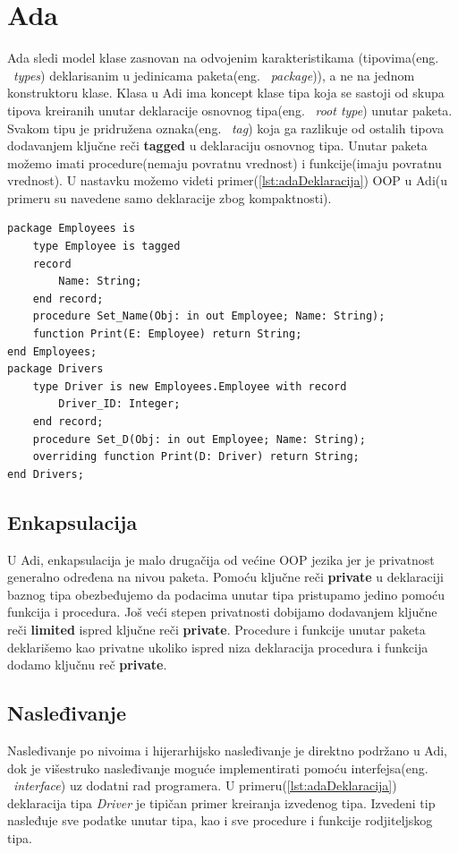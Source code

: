 \documentclass[a4paper]{article}
\begin{document}
{\section{Ada}
\label{sec:ada}

Ada sledi model klase zasnovan na odvojenim karakteristikama (tipovima(eng. ~{\em types}) deklarisanim u jedinicama paketa(eng. ~{\em package})), a ne na jednom konstruktoru klase\cite{oopAda}. Klasa u Adi ima koncept klase tipa koja se sastoji od skupa tipova kreiranih unutar deklaracije osnovnog tipa(eng. ~{\em root type}) unutar paketa. Svakom tipu je pridružena oznaka(eng. ~{\em tag}) koja ga razlikuje od ostalih tipova dodavanjem ključne reči \textbf{tagged} u deklaraciju osnovnog tipa. Unutar paketa možemo imati procedure(nemaju povratnu vrednost) i funkcije(imaju povratnu vrednost). U nastavku možemo videti primer(\ref{lst:adaDeklaracija}) OOP u Adi(u primeru su navedene samo deklaracije zbog kompaktnosti).

\begin{lstlisting}[caption={Primer objektno orijentisanog programiranja u jeziku Ada.},frame=single, label=lst:adaDeklaracija]
package Employees is 
	type Employee is tagged 
	record
		Name: String;
	end record;
	procedure Set_Name(Obj: in out Employee; Name: String);
	function Print(E: Employee) return String;
end Employees;
package Drivers
	type Driver is new Employees.Employee with record
		Driver_ID: Integer;
	end record;
	procedure Set_D(Obj: in out Employee; Name: String);
	overriding function Print(D: Driver) return String;
end Drivers;
\end{lstlisting}

\subsection{Enkapsulacija}
\label{subsec:adaEnkapsulacija}
U Adi, enkapsulacija je malo drugačija od većine OOP jezika jer je privatnost generalno određena na nivou paketa\cite{adaIntroduction}. Pomoću ključne reči \textbf{private} u deklaraciji baznog tipa obezbeđujemo da podacima unutar tipa pristupamo jedino pomoću funkcija i procedura. Još veći stepen privatnosti dobijamo dodavanjem ključne reči \textbf{limited} ispred ključne reči \textbf{private}. Procedure i funkcije unutar paketa deklarišemo kao privatne ukoliko ispred niza deklaracija procedura i funkcija dodamo ključnu reč \textbf{private}.

\subsection{Nasleđivanje}
\label{subsec:adaNasledjivanje}
Nasleđivanje po nivoima i hijerarhijsko nasleđivanje je direktno podržano u Adi, dok je višestruko nasleđivanje moguće implementirati pomoću interfejsa(eng. ~{\em interface}) uz dodatni rad programera. U primeru(\ref{lst:adaDeklaracija}) deklaracija tipa \textit{Driver} je tipičan primer kreiranja izvedenog tipa. Izvedeni tip nasleđuje sve podatke unutar tipa, kao i sve procedure i funkcije rodjiteljskog tipa.

}
\end{document}
